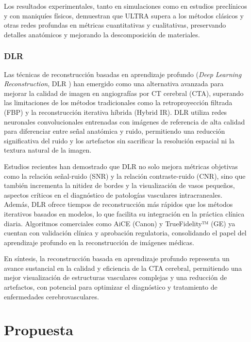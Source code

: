 Los resultados experimentales, tanto en simulaciones como en estudios preclínicos y con maniquíes físicos, demuestran que ULTRA supera a los métodos clásicos y otras redes profundas en métricas cuantitativas y cualitativas, preservando detalles anatómicos y mejorando la descomposición de materiales.

\subsubsection{DLR}

Las técnicas de reconstrucción basadas en aprendizaje profundo (\textit{Deep Learning Reconstruction}, DLR \cite{DLR}) han emergido como una alternativa avanzada para mejorar la calidad de imagen en angiografías por CT cerebral (CTA), superando las limitaciones de los métodos tradicionales como la retroproyección filtrada (FBP) y la reconstrucción iterativa híbrida (Hybrid IR). DLR utiliza redes neuronales convolucionales entrenadas con imágenes de referencia de alta calidad para diferenciar entre señal anatómica y ruido, permitiendo una reducción significativa del ruido y los artefactos sin sacrificar la resolución espacial ni la textura natural de la imagen.

Estudios recientes han demostrado que DLR no solo mejora métricas objetivas como la relación señal-ruido (SNR) y la relación contraste-ruido (CNR), sino que también incrementa la nitidez de bordes y la visualización de vasos pequeños, aspectos críticos en el diagnóstico de patologías vasculares intracraneales. Además, DLR ofrece tiempos de reconstrucción más rápidos que los métodos iterativos basados en modelos, lo que facilita su integración en la práctica clínica diaria. Algoritmos comerciales como AiCE (Canon) y TrueFidelity™ (GE) ya cuentan con validación clínica y aprobación regulatoria, consolidando el papel del aprendizaje profundo en la reconstrucción de imágenes médicas.

En síntesis, la reconstrucción basada en aprendizaje profundo representa un avance sustancial en la calidad y eficiencia de la CTA cerebral, permitiendo una mejor visualización de estructuras vasculares complejas y una reducción de artefactos, con potencial para optimizar el diagnóstico y tratamiento de enfermedades cerebrovasculares.

\section{Propuesta}

